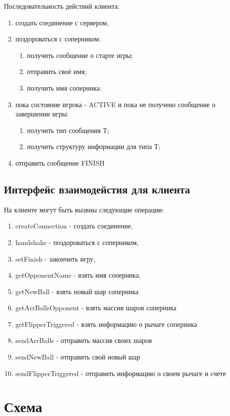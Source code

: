 Последовательность действий клиента:
\begin{enumerate}
\item создать соединение с сервером,
\item поздороваться с соперником:
  \begin{enumerate}
  \item получить сообщение о старте игры;
  \item отправить своё имя;
  \item получить имя соперника;
  \end{enumerate}
\item пока состояние игрока - ACTIVE и пока не получено сообщение о завершении игры:
  \begin{enumerate}
  \item получить тип сообщения Т;
  \item получить структуру информации для типа Т;
  \end{enumerate}
\item отправить сообщение FINISH
\end{enumerate}

\subsection{Интерфейс взаимодейстия для клиента}

На клиенте могут быть вызвны следующие операции:
\begin{enumerate}
\item createConnection - создать соединение,
\item handshake - поздороваться с соперником,
\item setFinish - закончить игру,
\item getOpponentName - взять имя соперника,
\item getNewBall - взять новый шар соперника
\item getArrBallsOpponent - взять массив шаров соперника
\item getFlipperTriggered - взять информацию о рычаге соперника
\item sendArrBalls  - отправить массив своих шаров
\item sendNewBall - отправить свой новый шар
\item sendFlipperTriggered - отправить информацию о своем рычаге и счете
\end{enumerate}

\section{Схема}

